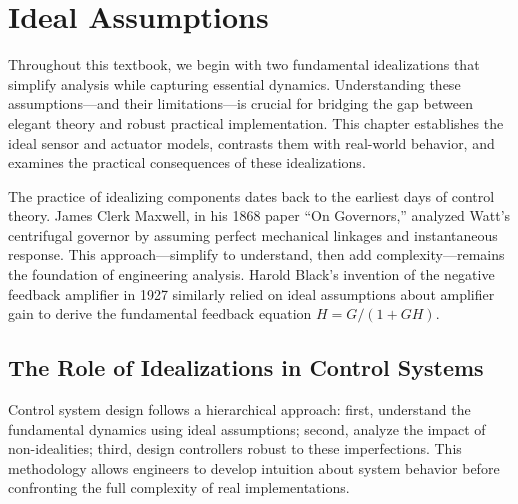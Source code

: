 
\chapter{Ideal Assumptions}
\label{ch:ideal_assumptions}

Throughout this textbook, we begin with two fundamental idealizations that simplify analysis while capturing essential dynamics. Understanding these assumptions---and their limitations---is crucial for bridging the gap between elegant theory and robust practical implementation. This chapter establishes the ideal sensor and actuator models, contrasts them with real-world behavior, and examines the practical consequences of these idealizations.

\begin{historicalbox}
The practice of idealizing components dates back to the earliest days of control theory. James Clerk Maxwell, in his 1868 paper ``On Governors,'' analyzed Watt's centrifugal governor by assuming perfect mechanical linkages and instantaneous response. This approach---simplify to understand, then add complexity---remains the foundation of engineering analysis. Harold Black's invention of the negative feedback amplifier in 1927 similarly relied on ideal assumptions about amplifier gain to derive the fundamental feedback equation $H = G/(1+GH)$.
\end{historicalbox}

\section{The Role of Idealizations in Control Systems}
\label{sec:role_idealizations}

Control system design follows a hierarchical approach: first, understand the fundamental dynamics using ideal assumptions; second, analyze the impact of non-idealities; third, design controllers robust to these imperfections. This methodology allows engineers to develop intuition about system behavior before confronting the full complexity of real implementations.

